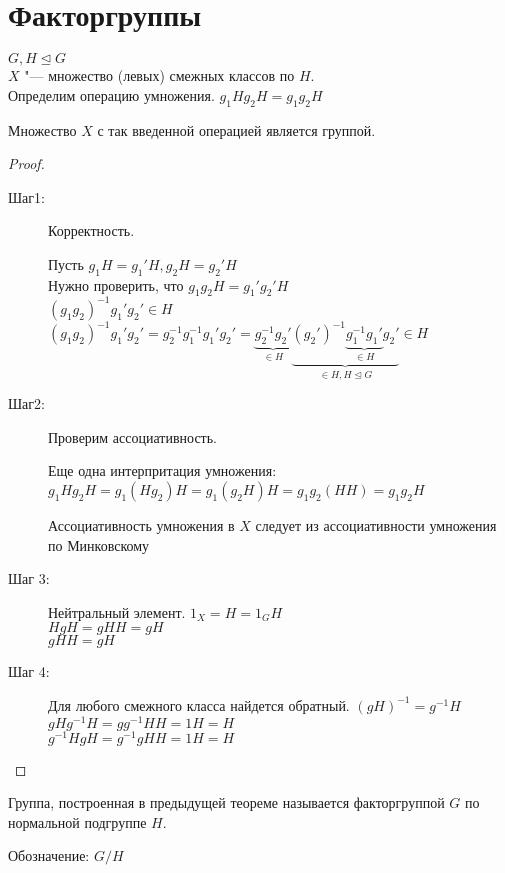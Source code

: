﻿\section{Факторгруппы}
$G, H \unlhd G$\\
$X$ "--- множество (левых) смежных классов по $H$.\\
Определим операцию умножения. 
$g_1H g_2H = g_1g_2H$
\begin{theorem}
Множество $X$ с так введенной операцией является группой. 
\end{theorem}
\begin{proof}
\begin{description}
\item[Шаг1:]
Корректность. 

Пусть $g_1H = g_1'H, g_2H = g_2'H$\\
Нужно проверить, что $g_1g_2H = g_1'g_2'H$\\

$(g_1g_2)^{-1}g_1'g_2' \in H$\\
$(g_1g_2)^{-1}g_1'g_2' = g_2^{-1}g_1^{-1}g_1'g_2' = \underbrace{g_2^{-1}g_2'}_{\in H} \underbrace{(g_2')^{-1} \underbrace{g_1^{-1}g_1'}_{\in H}g_2'}_{\in H, H \unlhd G} \in H$\\
\item [Шаг2:]
Проверим ассоциативность.

Еще одна интерпритация умножения:
$g_1Hg_2H = g_1(Hg_2)H = g_1(g_2H)H = g_1g_2(HH) = g_1g_2H$


Ассоциативность умножения в $X$ следует  из ассоциативности умножения по Минковскому\\
\item [Шаг 3:]
Нейтральный элемент. 
$1_X = H = 1_GH$\\
$HgH = gHH = gH$\\
$gHH = gH$\\
\item [Шаг 4:]
Для любого смежного класса найдется обратный. 
$(gH)^{-1} = g^{-1}H$\\
$gHg^{-1}H = gg^{-1}HH = 1H = H$\\
$g^{-1}HgH = g^{-1}gHH = 1H = H$\\
\end{description}
\end{proof}
\begin{Def}
Группа, построенная в предыдущей теореме называется факторгруппой $G$ по нормальной подгруппе $H$.

Обозначение: $G / H$\\
\end{Def}

